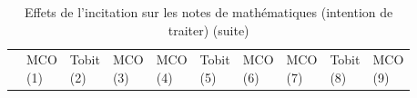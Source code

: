 \documentclass[
]{book}
\begin{document}
\begin{landscape}
\begin{ThreePartTable}
\begin{longtable}[t]{llllllllll}
\midrule
\endfirsthead
\caption[]{\label{tab:g20rfmodels}Effets de l'incitation sur les notes de mathématiques (intention de traiter) (suite)}\\
\toprule
  & \makecell{MCO \\ (1) } & \makecell{Tobit \\ (2) } & \makecell{MCO \\ (3) } & \makecell{MCO \\ (4) } & \makecell{Tobit \\ (5) } & \makecell{MCO \\ (6) } & \makecell{MCO \\ (7) } & \makecell{Tobit \\ (8) } & \makecell{MCO \\ (9) }\\
\midrule
\endhead


\end{longtable}
\end{ThreePartTable}
\end{landscape}
\end{document}
